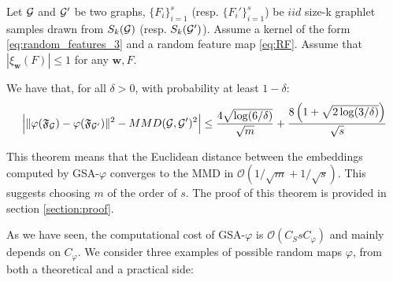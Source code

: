 \begin{theorem}
\label{theorem:concentration}
Let $\mathcal{G}$ and $\mathcal{G}'$ be two graphs, $\{F_i\}_{i=1}^{s}$ (resp. $\{F_i'\}_{i=1}^{s}$) be $iid$ size-k graphlet samples drawn from $S_k(\mathcal{G})$ (resp. $S_k(\mathcal{G}')$). Assume a kernel of the form \eqref{eq:random_features_3} and a random feature map \eqref{eq:RF}. Assume that $|\xi_\mathbf{w}(F)| \leq 1$ for any $\mathbf{w},F$.

We have that, for all $\delta>0$, with probability at least $1-\delta$:
\begin{align*}
 \Big|\|\varphi(\mathfrak{F}_{\mathcal{G}}) - \varphi(\mathfrak{F}_{\mathcal{G}'})\|^2 - MMD(\mathcal{G},\mathcal{G}')^2 \Big| \leq \frac{4 \sqrt{\log (6/\delta)}}{\sqrt{m}} + \frac{8\left(1+\sqrt{2\log(3/\delta)}\right)}{\sqrt{{s}}}
\end{align*}
\end{theorem}
This theorem means that the Euclidean distance between the embeddings computed by GSA-$\varphi$ converges to the MMD in $\mathcal{O}(1/\sqrt{m} + 1/\sqrt{s})$. This suggests choosing $m$ of the order of $s$. The proof of this theorem is provided in section \ref{section:proof}.

As we have seen, the computational cost of GSA-$\varphi$ is $\mathcal{O}(C_S s C_\varphi)$ and mainly depends on $C_\varphi$. We consider three examples of possible random maps $\varphi$, from both a theoretical and a practical side:


